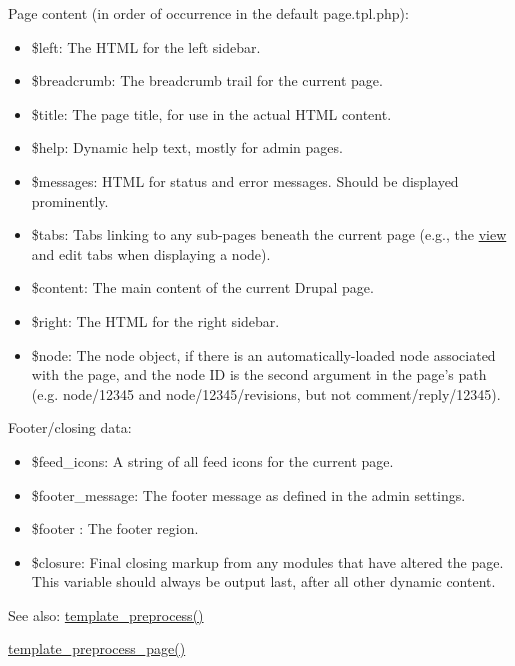 Page content (in order of occurrence in the default page.tpl.php):\begin{itemize}
\item \$left: The HTML for the left sidebar.\item \$breadcrumb: The breadcrumb trail for the current page.\item \$title: The page title, for use in the actual HTML content.\item \$help: Dynamic help text, mostly for admin pages.\item \$messages: HTML for status and error messages. Should be displayed prominently.\item \$tabs: Tabs linking to any sub-pages beneath the current page (e.g., the \hyperlink{classview}{view} and edit tabs when displaying a node).\item \$content: The main content of the current Drupal page.\item \$right: The HTML for the right sidebar.\item \$node: The node object, if there is an automatically-loaded node associated with the page, and the node ID is the second argument in the page's path (e.g. node/12345 and node/12345/revisions, but not comment/reply/12345).\end{itemize}


Footer/closing data:\begin{itemize}
\item \$feed\_\-icons: A string of all feed icons for the current page.\item \$footer\_\-message: The footer message as defined in the admin settings.\item \$footer : The footer region.\item \$closure: Final closing markup from any modules that have altered the page. This variable should always be output last, after all other dynamic content.\end{itemize}


\begin{Desc}
\item[See also:]\hyperlink{includes_2theme_8inc_3eeb7bcdba7ef4859f99586da264d347}{template\_\-preprocess()} 

\hyperlink{includes_2theme_8inc_128dae24f990d8ba4710ac78b0584c11}{template\_\-preprocess\_\-page()} \end{Desc}
